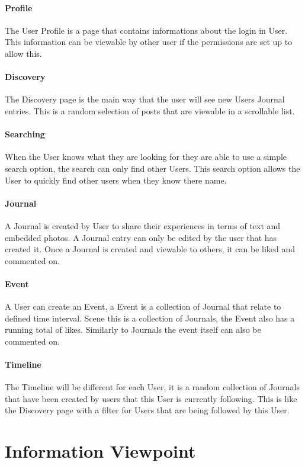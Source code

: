 \documentclass[compsoc, 10, draftclsnofoot, onecolumn]{IEEEtran}
\begin{document}
\paragraph*{Profile}
The User Profile is a page that contains informations about the login in User. This information can be viewable by other user if the permissions are set up to allow this.
\paragraph*{Discovery}
The Discovery page is the main way that the user will see new Users Journal entries. This is a random selection of posts that are viewable in a scrollable list. 
\paragraph*{Searching}
When the User knows what they are looking for they are able to use a simple search option, the search can only find other Users. This search option allows the User to quickly find other users when they know there name.
\paragraph*{Journal}
A Journal is created by User to share their experiences in terms of text and embedded photos. A Journal entry can only be edited by the user that has created it. Once a Journal is created and viewable to others, it can be liked and commented on. 
\paragraph*{Event}
A User can create an Event, a Event is a collection of Journal that relate to defined time interval. Scene this is a collection of Journals, the Event also has a running total of likes. Similarly to Journals the event itself can also be commented on.
\paragraph*{Timeline}
The Timeline will be different for each User, it is a random collection of Journals that have been created by users that this User is currently following. This is like the Discovery page with a filter for Users that are being followed by this User.

\section{Information Viewpoint}
\end{document}
